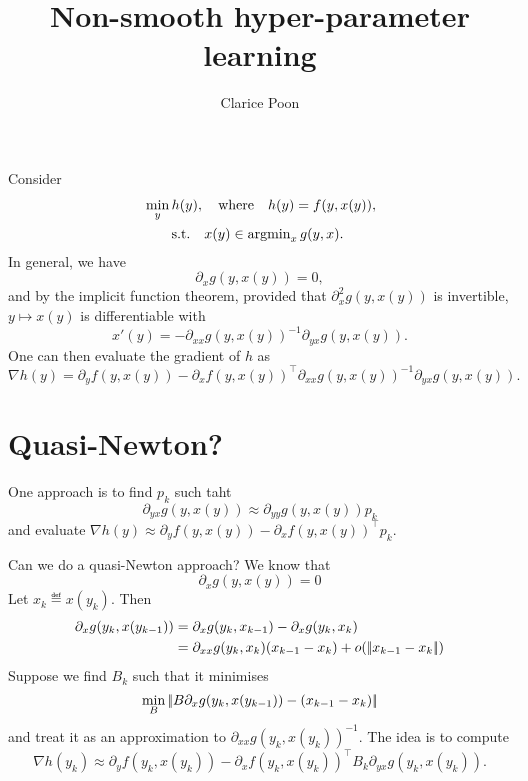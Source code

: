 \documentclass{article}
\title{Non-smooth hyper-parameter learning }
\author{%
  Clarice Poon
}
\begin{document}
\maketitle


Consider
\begin{align*}
&\min_{y} h(y), \quad \text{where} \quad h(y) = f(y, x(y)),\\
 &\qquad \text{s.t.}  \quad x(y)\in \operatorname{argmin}_x g(y,x).
\end{align*}
In general, we have
$$
\partial_x g(y,x(y)) = 0,
$$
and by the implicit function theorem, provided that $\partial_{x}^2 g(y,x(y))$ is invertible, $y\mapsto x(y)$ is differentiable with
$$
x'(y) = - \partial_{xx}g(y,x(y))^{-1} \partial_{yx} g(y, x(y)).
$$
One can then evaluate the gradient of $h$ as
\begin{equation}\label{eq:gradient_bilev}
\nabla h(y) = \partial_y f(y, x(y)) - \partial_x f(y,x(y))^\top  \partial_{xx}g(y,x(y))^{-1} \partial_{yx} g(y, x(y)).
\end{equation}


\section{Quasi-Newton?}
One approach is to  find $p_k$ such taht
$$
 \partial_{yx} g(y, x(y))\approx  \partial_{yy}g(y,x(y))  p_k
 $$
 and evaluate $\nabla h(y) \approx \partial_y f(y, x(y)) - \partial_x f(y,x(y))^\top p_k$.


Can we do a quasi-Newton approach?
We know that
$$
\partial_x g(y,x(y)) = 0
$$
Let $x_k\eqdef x(y_k)$. Then
\begin{align*}
\partial_x g(y_k,x(y_{k-1})) &=
\partial_x g(y_k,x_{k-1})- \partial_x g(y_k,x_k) \\
& = \partial_{xx} g(y_k, x_k) (x_{k-1} - x_{k}) + o(|\!| x_{k-1}-x_k |\!|)
\end{align*}
Suppose we find $B_{k}$ such that it minimises
$$
\min_B|\!|  B  \partial_x g(y_{k},x(y_{k-1})) - (x_{k-1} - x_{k})  |\!|
$$
and treat it as an approximation to $\partial_{xx} g(y_{k}, x(y_{k})) ^{-1}$. The idea is to compute
$$\nabla h(y_k) \approx \partial_y f(y_k, x(y_k)) - \partial_x f(y_k,x(y_k))^\top  B_{k} \partial_{yx} g(y_k, x(y_k)).
$$
\end{document}
